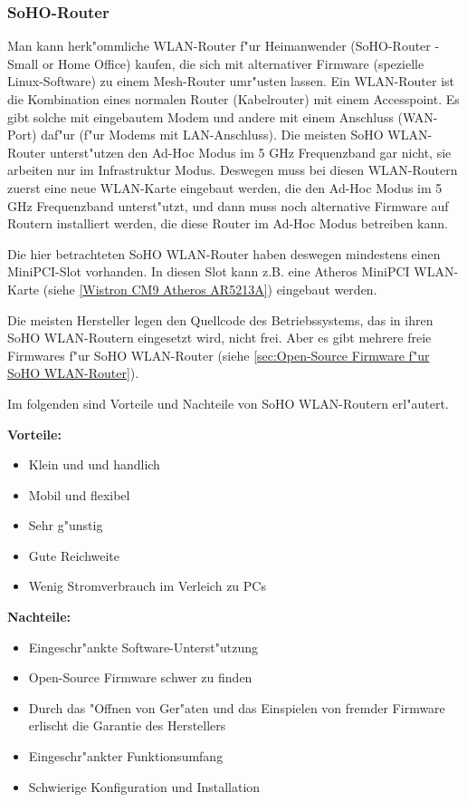 \subsubsection{SoHO-Router}

Man kann herk"ommliche WLAN-Router f"ur Heimanwender (SoHO-Router - Small
or Home Office) kaufen, die sich mit alternativer Firmware (spezielle
Linux-Software) zu einem Mesh-Router umr"usten lassen. Ein WLAN-Router
ist die Kombination eines normalen Router (Kabelrouter) mit einem
Accesspoint. Es gibt solche mit eingebautem Modem und andere mit einem
Anschluss (WAN-Port) daf"ur (f"ur Modems mit LAN-Anschluss).
Die meisten SoHO WLAN-Router unterst"utzen den Ad-Hoc Modus im 5 GHz
Frequenzband gar nicht, sie arbeiten nur im Infrastruktur Modus. Deswegen
muss bei diesen WLAN-Routern zuerst eine neue WLAN-Karte eingebaut werden,
die den Ad-Hoc Modus im 5 GHz Frequenzband unterst"utzt, und dann muss noch
alternative Firmware auf Routern installiert werden, die diese Router
im Ad-Hoc Modus betreiben kann.

Die hier betrachteten SoHO WLAN-Router haben deswegen mindestens einen
MiniPCI-Slot vorhanden. In diesen Slot kann z.B. eine Atheros MiniPCI
WLAN-Karte (siehe \ref{Wistron CM9 Atheros AR5213A}) eingebaut werden.

Die meisten Hersteller legen den Quellcode des Betriebssystems, das in
ihren SoHO WLAN-Routern eingesetzt wird, nicht frei. Aber es gibt
mehrere freie Firmwares f"ur SoHO WLAN-Router (siehe
\ref{sec:Open-Source Firmware f"ur SoHO WLAN-Router}).

Im folgenden sind Vorteile und Nachteile von SoHO WLAN-Routern erl"autert.

\textbf{Vorteile:}

\begin{itemize}
	\item Klein und	und handlich
	\item Mobil und flexibel
	\item Sehr g"unstig
	\item Gute Reichweite
	\item Wenig Stromverbrauch im Verleich zu PCs
\end{itemize}

\textbf{Nachteile:}

\begin{itemize}
	\item Eingeschr"ankte Software-Unterst"utzung
	\item Open-Source Firmware schwer zu finden
	\item Durch das "Offnen von Ger"aten und das Einspielen von
	fremder Firmware erlischt die Garantie des Herstellers
	\item Eingeschr"ankter Funktionsumfang
	\item Schwierige Konfiguration und Installation
\end{itemize}

